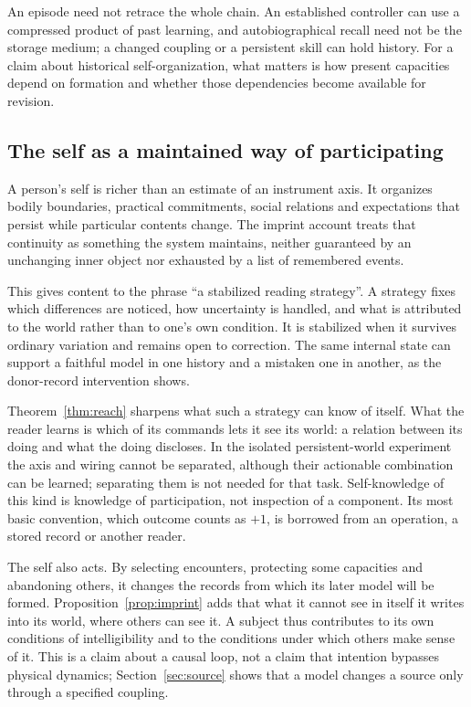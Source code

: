 \documentclass[11pt,a4paper]{article}
\begin{document}
An episode need not retrace the whole chain. An established controller can use a compressed product of past learning, and autobiographical recall need not be the storage medium; a changed coupling or a persistent skill can hold history. For a claim about historical self-organization, what matters is how present capacities depend on formation and whether those dependencies become available for revision.

\subsection{The self as a maintained way of participating}

A person's self is richer than an estimate of an instrument axis. It organizes bodily boundaries, practical commitments, social relations and expectations that persist while particular contents change. The imprint account treats that continuity as something the system maintains, neither guaranteed by an unchanging inner object nor exhausted by a list of remembered events.

This gives content to the phrase ``a stabilized reading strategy''. A strategy fixes which differences are noticed, how uncertainty is handled, and what is attributed to the world rather than to one's own condition. It is stabilized when it survives ordinary variation and remains open to correction. The same internal state can support a faithful model in one history and a mistaken one in another, as the donor-record intervention shows.

Theorem~\ref{thm:reach} sharpens what such a strategy can know of itself. What the reader learns is which of its commands lets it see its world: a relation between its doing and what the doing discloses. In the isolated persistent-world experiment the axis and wiring cannot be separated, although their actionable combination can be learned; separating them is not needed for that task. Self-knowledge of this kind is knowledge of participation, not inspection of a component. Its most basic convention, which outcome counts as $+1$, is borrowed from an operation, a stored record or another reader.

The self also acts. By selecting encounters, protecting some capacities and abandoning others, it changes the records from which its later model will be formed. Proposition~\ref{prop:imprint} adds that what it cannot see in itself it writes into its world, where others can see it. A subject thus contributes to its own conditions of intelligibility and to the conditions under which others make sense of it. This is a claim about a causal loop, not a claim that intention bypasses physical dynamics; Section~\ref{sec:source} shows that a model changes a source only through a specified coupling.
\end{document}
